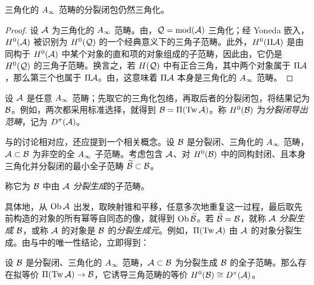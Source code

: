 \begin{lemma}\label{st:4.8}
三角化的 $A_\infty$ 范畴的分裂闭包仍然三角化。
\end{lemma}
\begin{proof}
设 $\mathcal A$ 为三角化的 $A_\infty$ 范畴。由，$\mathcal Q=\operatorname{mod}(\mathcal A)$ 三角化；经 Yoneda 嵌入，$H^0(\mathcal A)$ 被识别为 $H^0(\mathcal Q)$ 的一个经典意义下的三角子范畴。此外，$H^0(\Pi\mathcal A)$ 是由同构于 $H^0(\mathcal A)$ 中某个对象的直和项的对象组成的子范畴，因此由，它仍是 $H^0(\mathcal Q)$ 的三角子范畴。换言之，若 $H(\mathcal Q)$ 中有正合三角，其中两个对象属于 $\Pi\mathcal A$，那么第三个也属于 $\Pi\mathcal A$。由，这意味着 $\Pi\mathcal A$ 本身是三角化的 $A_\infty$ 范畴。
\end{proof}
\begin{definition*}
设 $\mathcal A$ 是任意 $A_\infty$ 范畴；先取它的三角化包络，再取后者的分裂闭包，将结果记为 $\mathcal B$。例如，两次都采用标准选择，就得到 $\mathcal B=\Pi(\operatorname{Tw}\mathcal A)$。称 $H^0(\mathcal B)$ 为\emph{分裂闭导出范畴}，记为 $D^{\pi}(\mathcal A)$。
\end{definition*}
与的讨论相对应，还应提到一个相关概念。设 $\mathcal B$ 是分裂闭、三角化的 $A_\infty$ 范畴，$\mathcal A\subset\mathcal B$ 为非空的全 $A_\infty$ 子范畴。考虑包含 $\mathcal A$、对 $H^0(\mathcal B)$ 中的同构封闭、且本身三角化并分裂闭的最小全子范畴 $\widetilde{\mathcal B}\subset\mathcal B$。
\begin{definition*}
称它为 $\mathcal B$ 中由 $\mathcal A$ \emph{分裂生成}的子范畴。
\end{definition*}
具体地，从 $\operatorname{Ob}\mathcal A$ 出发，取映射锥和平移，任意多次地重复这一过程，最后取先前构造的对象的所有幂等自同态的像，就得到 $\operatorname{Ob}\widetilde{\mathcal B}$。若 $\widetilde{\mathcal B}=\mathcal B$，就称 $\mathcal A$ \emph{分裂生成} $\mathcal B$，或称 $\mathcal A$ 的对象是 $\mathcal B$ 的\emph{分裂生成元}。例如，$\Pi(\operatorname{Tw}\mathcal A)$ 由 $\mathcal A$ 的对象分裂生成。由与中的唯一性结论，立即得到：
\begin{corollary}\label{st:4.9}
设 $\mathcal B$ 是分裂闭、三角化的 $A_\infty$ 范畴，$\mathcal A\subset\mathcal B$ 为分裂生成 $\mathcal B$ 的全子范畴。那么存在拟等价 $\Pi(\operatorname{Tw}\mathcal A)\to\mathcal B$，它诱导三角范畴的等价 $H^0(\mathcal B)\cong D^{\pi}(\mathcal A)$。
\end{corollary}
